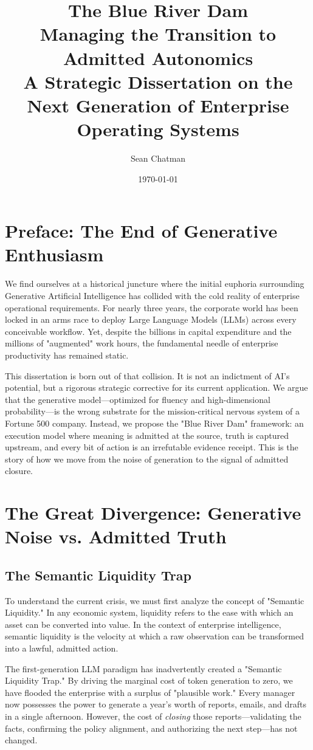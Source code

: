\documentclass[12pt,a4paper,oneside]{book}
\title{\textbf{\huge \color{hbrblue}The Blue River Dam}\\\vspace{1em}\Large \color{hbrred}Managing the Transition to Admitted Autonomics\\\vspace{0.5em}A Strategic Dissertation on the Next Generation of Enterprise Operating Systems}
\author{Sean Chatman}
\date{\today}
\begin{document}
\maketitle

\chapter*{Preface: The End of Generative Enthusiasm}
We find ourselves at a historical juncture where the initial euphoria surrounding Generative Artificial Intelligence has collided with the cold reality of enterprise operational requirements. For nearly three years, the corporate world has been locked in an arms race to deploy Large Language Models (LLMs) across every conceivable workflow. Yet, despite the billions in capital expenditure and the millions of "augmented" work hours, the fundamental needle of enterprise productivity has remained static. 

This dissertation is born out of that collision. It is not an indictment of AI's potential, but a rigorous strategic corrective for its current application. We argue that the generative model—optimized for fluency and high-dimensional probability—is the wrong substrate for the mission-critical nervous system of a Fortune 500 company. Instead, we propose the "Blue River Dam" framework: an execution model where meaning is admitted at the source, truth is captured upstream, and every bit of action is an irrefutable evidence receipt. This is the story of how we move from the noise of generation to the signal of admitted closure.

\tableofcontents

\chapter{The Great Divergence: Generative Noise vs. Admitted Truth}

\section{The Semantic Liquidity Trap}
To understand the current crisis, we must first analyze the concept of "Semantic Liquidity." In any economic system, liquidity refers to the ease with which an asset can be converted into value. In the context of enterprise intelligence, semantic liquidity is the velocity at which a raw observation can be transformed into a lawful, admitted action. 

The first-generation LLM paradigm has inadvertently created a "Semantic Liquidity Trap." By driving the marginal cost of token generation to zero, we have flooded the enterprise with a surplus of "plausible work." Every manager now possesses the power to generate a year's worth of reports, emails, and drafts in a single afternoon. However, the cost of \textit{closing} those reports—validating the facts, confirming the policy alignment, and authorizing the next step—has not changed. 
\end{document}
